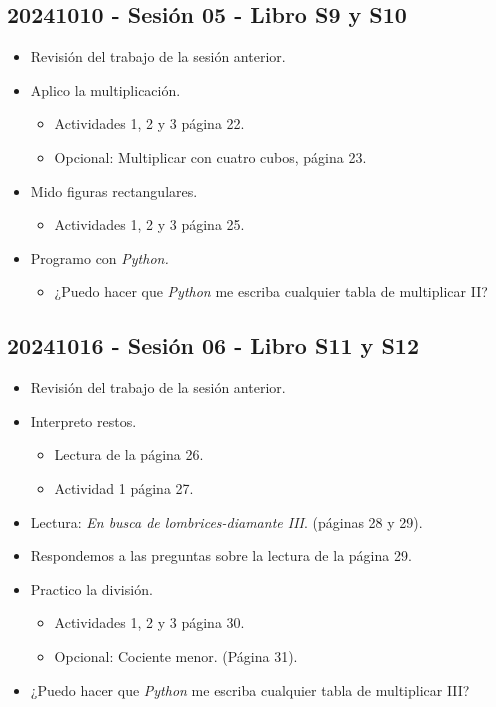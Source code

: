\documentclass[a4paper,12pt]{article}
\begin{document}
\subsection{20241010 - Sesión 05 - Libro S9 y S10}

\begin{itemize}
    \item Revisión del trabajo de la sesión anterior.
    \item Aplico la multiplicación.
    \begin{itemize}
        \item Actividades 1, 2 y 3 página 22.
        \item Opcional: Multiplicar con cuatro cubos, página 23.
    \end{itemize}
    \item Mido figuras rectangulares.
    \begin{itemize}
        \item Actividades 1, 2 y 3 página 25.
    \end{itemize}
    \item Programo con \textit{Python.}
    \begin{itemize}
        \item ¿Puedo hacer que \textit{Python} me escriba cualquier tabla de multiplicar II?
    \end{itemize}
\end{itemize}

\subsection{20241016 - Sesión 06 - Libro S11 y S12}

\begin{itemize}
    \item Revisión del trabajo de la sesión anterior.
    \item Interpreto restos.
    \begin{itemize}
        \item Lectura de la página 26.
        \item Actividad 1 página 27.
    \end{itemize}
    \item Lectura: \textit{En busca de lombrices-diamante III}. (páginas 28 y 29).
    \item Respondemos a las preguntas sobre la lectura de la página 29.
    \item Practico la división.
    \begin{itemize}
        \item Actividades 1, 2 y 3 página 30.
        \item Opcional: Cociente menor. (Página 31).
    \end{itemize}
    \item ¿Puedo hacer que \textit{Python} me escriba cualquier tabla de multiplicar III?
\end{itemize}
\end{document}
